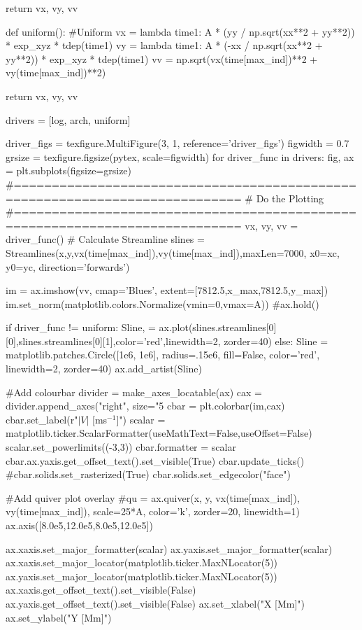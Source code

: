 \begin{pycode}[chapter4]
	return vx, vy, vv

def uniform():
    #Uniform
    vx = lambda time1: A * (yy / np.sqrt(xx**2 + yy**2)) * exp_xyz * tdep(time1)
    vy = lambda time1: A * (-xx / np.sqrt(xx**2 + yy**2)) * exp_xyz * tdep(time1)
    vv = np.sqrt(vx(time[max_ind])**2 + vy(time[max_ind])**2)
    
    return vx, vy, vv

drivers = [log, arch, uniform]

driver_figs = texfigure.MultiFigure(3, 1, reference='driver_figs')
figwidth = 0.7
grsize = texfigure.figsize(pytex, scale=figwidth)
for driver_func in drivers:
    fig, ax = plt.subplots(figsize=grsize)
    #============================================================================
    # Do the Plotting
    #============================================================================
    vx, vy, vv = driver_func()
    # Calculate Streamline
    slines = Streamlines(x,y,vx(time[max_ind]),vy(time[max_ind]),maxLen=7000,
                         x0=xc, y0=yc, direction='forwards')

    im = ax.imshow(vv, cmap='Blues', extent=[7812.5,x_max,7812.5,y_max])
    im.set_norm(matplotlib.colors.Normalize(vmin=0,vmax=A))
    #ax.hold()
    
    if driver_func != uniform:
        Sline, = ax.plot(slines.streamlines[0][0],slines.streamlines[0][1],color='red',linewidth=2, zorder=40)
    else:
	    Sline = matplotlib.patches.Circle([1e6, 1e6], radius=.15e6, fill=False, color='red', linewidth=2, zorder=40)
	    ax.add_artist(Sline)

    #Add colourbar
    divider = make_axes_locatable(ax)
    cax = divider.append_axes("right", size="5%
    cbar = plt.colorbar(im,cax)
    cbar.set_label(r"$|V|$ [ms$^{-1}$]")
    scalar = matplotlib.ticker.ScalarFormatter(useMathText=False,useOffset=False)
    scalar.set_powerlimits((-3,3))
    cbar.formatter = scalar
    cbar.ax.yaxis.get_offset_text().set_visible(True)
    cbar.update_ticks()
    #cbar.solids.set_rasterized(True)
    cbar.solids.set_edgecolor("face")

    #Add quiver plot overlay
    #qu = ax.quiver(x, y, vx(time[max_ind]), vy(time[max_ind]), scale=25*A, color='k', zorder=20, linewidth=1)
    ax.axis([8.0e5,12.0e5,8.0e5,12.0e5])

    ax.xaxis.set_major_formatter(scalar)
    ax.yaxis.set_major_formatter(scalar)
    ax.xaxis.set_major_locator(matplotlib.ticker.MaxNLocator(5))
    ax.yaxis.set_major_locator(matplotlib.ticker.MaxNLocator(5))
    ax.xaxis.get_offset_text().set_visible(False)
    ax.yaxis.get_offset_text().set_visible(False)
    ax.set_xlabel("X [Mm]")
    ax.set_ylabel("Y [Mm]")


\end{pycode}

